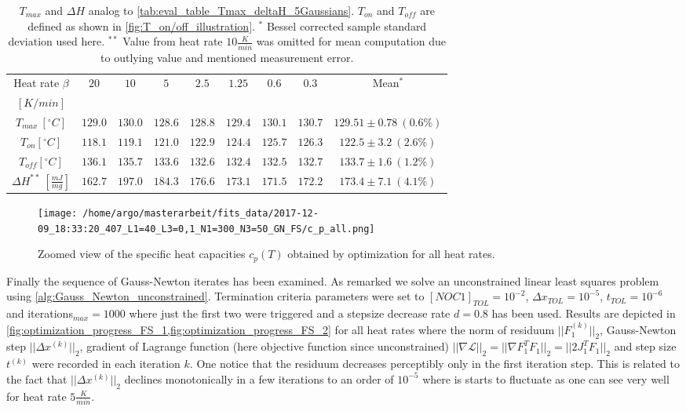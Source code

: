 \documentclass{scrartcl}[12pt, halfparskip]
\numberwithin{equation}{section}
\numberwithin{figure}{section}
\numberwithin{table}{section}
\begin{document}
\begin{table}[H]
	\centering
	\begin{tabular}{| c | c | c | c | c | c | c | c || c |} \hline
		Heat rate $\beta$ & $20$ & $10$ & $5$ & $2.5$ & $1.25$ & $0.6$ & $0.3$ & Mean$^*$ \\
		$[K/min]$ & & & & & & & & \\ \hline
		$T_{max} \ [^{\circ}C]$ & $129.0$ & $130.0$ & $128.6$ & $128.8$ & $129.4$ & $130.1$ & $130.7$ & $129.51 \pm 0.78 \ (0.6\%)$ \\[0.7ex]
		$T_{on} [^{\circ} C]$ & $118.1$ & $119.1$ & $121.0$ & $122.9$ & $124.4$ & $125.7$ & $126.3$ & $122.5 \pm 3.2 \ (2.6\%)$ \\[0.7ex]
		$T_{off} [^{\circ} C]$ & $136.1$ & $135.7$ & $133.6$ & $132.6$ & $132.4$ & $132.5$ & $132.7$ & $133.7 \pm 1.6 \ (1.2\%)$ \\[0.7ex]
		$\Delta H^{**} \ [\frac{mJ}{mg}]$ & $162.7$ & $197.0$ & $184.3$ & $176.6$ & $173.1$ & $171.5$ & $172.2$ & $173.4 \pm 7.1 \ (4.1\%)$ \\ \hline
	\end{tabular}
	\caption{$T_{max}$ and $\Delta H$ analog to \cref{tab:eval_table_Tmax_deltaH_5Gaussians}. $T_{on}$ and $T_{off}$ are defined as shown in \cref{fig:T_on/off_illustration}.
	$^{*}$ Bessel corrected sample standard deviation used here.
	$^{**}$ Value from heat rate $10 \frac{K}{min}$ was omitted for mean computation due to outlying value and mentioned measurement error.}
	\label{tab:eval_table_Tmax_deltaH_FS}
\end{table}



\begin{figure}[H]
	\centering
	\texttt{[image: /home/argo/masterarbeit/fits\_data/2017-12-09\_18:33:20\_407\_L1=40\_L3=0,1\_N1=300\_N3=50\_GN\_FS/c\_p\_all.png]}
	\caption{Zoomed view of the specific heat capacities $c_p(T)$ obtained by optimization for all heat rates.}
	\label{fig:FS_all_c_p}
\end{figure}


Finally the sequence of Gauss-Newton iterates has been examined. As remarked we solve an unconstrained linear least squares problem using \cref{alg:Gauss_Newton_unconstrained}. Termination criteria parameters were set to $[NOC1]_{TOL}=10^{-2}$, $\Delta x_{TOL}=10^{-5}$, $t_{TOL}=10^{-6}$ and iterations$_{max}=1000$ where just the first two were triggered and a stepsize decrease rate $d=0.8$ has been used. Results are depicted in \cref{fig:optimization_progress_FS_1,fig:optimization_progress_FS_2} for all heat rates where the norm of residuum $||F_1^{(k)}||_2$, Gauss-Newton step $||\Delta x^{(k)}||_2$, gradient of Lagrange function (here objective function since unconstrained) $|| \nabla \mathcal{L} ||_2 = || \nabla F_1^T F_1 ||_2 = || 2 J_1^T F_1 ||_2$ and step size $t^{(k)}$ were recorded in each iteration $k$. One notice that the residuum decreases perceptibly only in the first iteration step. This is related to the fact that $||\Delta x^{(k)}||_2$ declines monotonically in a few iterations to an order of $10^{-5}$ where is starts to fluctuate as one can see very well for heat rate $5 \frac{K}{min}$.
\end{document}
